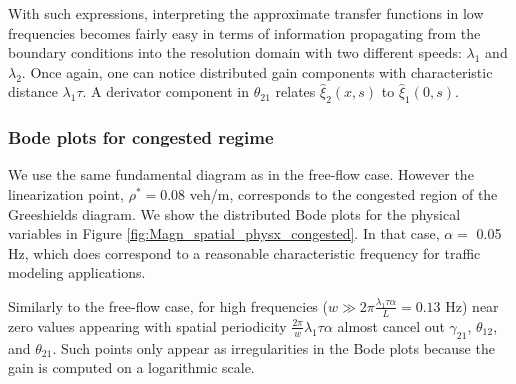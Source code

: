\documentclass[a4paper, 10pt, conference]{ieeeconf}      %
\begin{document}
With such expressions, interpreting the approximate transfer functions in low frequencies becomes fairly easy in terms of information propagating from the boundary conditions into the resolution domain with two different speeds: $\lambda_1$ and $\lambda_2$. Once again, one can notice distributed gain components with characteristic distance $\lambda_1 \tau$. A derivator component in $\theta_{21}$ relates $\hat{\xi}_2(x,s)$ to $\hat{\xi}_1(0,s)$.

\subsubsection{Bode plots for congested regime}
We use the same fundamental diagram as in the free-flow case. However the linearization point, $\rho^* = 0.08$ veh/m, corresponds to the congested region of the Greeshields diagram. We show the distributed Bode plots for the physical variables in Figure \ref{fig:Magn_spatial_physx_congested}. In that case, $\alpha =$ 0.05 Hz, which does correspond to a reasonable characteristic frequency for traffic modeling applications.

Similarly to the free-flow case, for high frequencies ($w \gg 2 \pi \frac{\lambda_{1} \tau \alpha}{L} = 0.13$ Hz) near zero values appearing with spatial periodicity $\frac{2 \pi}{w} \lambda_{1} \tau \alpha$ almost cancel out $\gamma_{21}$, $\theta_{12}$, and $\theta_{21}$. Such points only appear as irregularities in the Bode plots because the gain is computed on a logarithmic scale.
\end{document}
